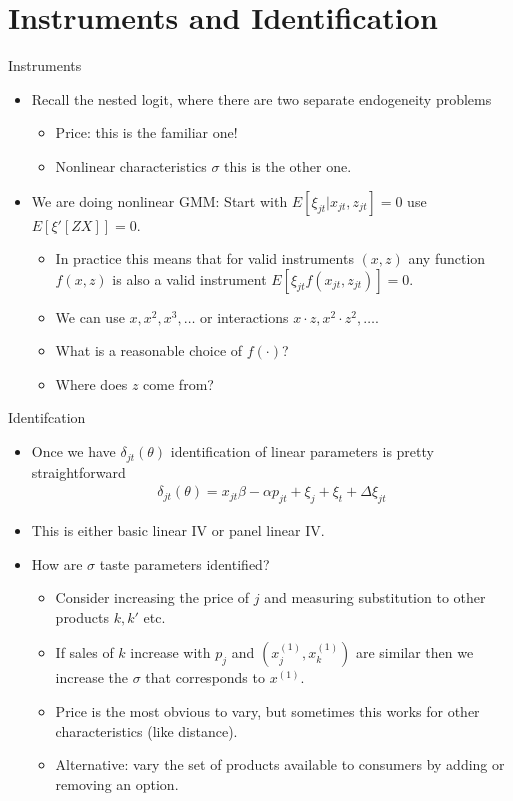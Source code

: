\documentclass[xcolor=pdftex,dvipsnames,table,mathserif,aspectratio=169]{beamer}
\begin{document}
\section{Instruments and Identification}

\begin{frame}{Instruments}
\begin{itemize}
\item Recall the nested logit, where there are two separate endogeneity problems
\begin{itemize}
\item \alert{Price}: this is the familiar one!
\item \alert{Nonlinear characteristics} $\sigma$ this is the other one.
\end{itemize}
\item We are doing nonlinear GMM: Start with $E[\xi_{jt} | x_{jt}, z_{jt}]=0$ use $E[\xi' [Z X]]=0$.
\begin{itemize}
\item In practice this means that for valid instruments $(x,z)$ any function $f(x,z)$ is also a valid instrument $E[ \xi_{jt} f(x_{jt},z_{jt})]=0$.
\item We can use $x, x^2, x^3,\ldots$ or interactions $x \cdot z, x^2 \cdot z^2, \ldots$.
\item What is a reasonable choice of $f(\cdot)$?
\item Where does $z$ come from?
\end{itemize}
\end{itemize}
\end{frame}

\begin{frame}{Identifcation}
\begin{itemize}
\item Once we have $\delta_{jt}(\theta)$ identification of linear parameters is pretty straightforward
\begin{eqnarray*}
\delta_{jt}(\theta) = x_{jt} \beta - \alpha p_{jt} + \xi_j + \xi_t + \Delta \xi_{jt}
\end{eqnarray*}
\item This is either basic linear IV or panel linear IV.
\item How are $\sigma$ taste parameters identified?
\begin{itemize}
\item Consider increasing the price of $j$ and measuring substitution to other products $k,k'$ etc.
\item If sales of $k$ increase with $p_j$ and $(x_j^{(1)},x_k^{(1)})$ are similar then we increase the $\sigma$ that corresponds to $x^{(1)}$.
\item Price is the most obvious to vary, but sometimes this works for other characteristics (like distance).
\item Alternative: vary the set of products available to consumers by adding or removing an option.
\end{itemize}
\end{itemize}
\end{frame}
\end{document}
